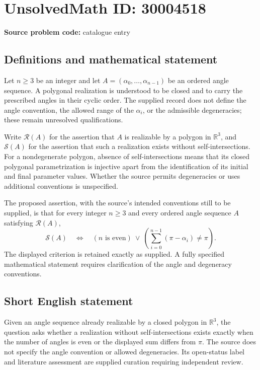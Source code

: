 \documentclass[11pt]{article}
\newcommand{\R}{\mathbb{R}}
\begin{document}
\section*{UnsolvedMath ID: 30004518}
\textbf{Source problem code:} catalogue entry
\subsection{Definitions and mathematical statement}
Let \(n\geq 3\) be an integer and let \(A=(\alpha_0,\ldots,\alpha_{n-1})\) be an ordered angle sequence. A polygonal realization is understood to be closed and to carry the prescribed angles in their cyclic order. The supplied record does not define the angle convention, the allowed range of the \(\alpha_i\), or the admissible degeneracies; these remain unresolved qualifications.

Write \(\mathcal R(A)\) for the assertion that \(A\) is realizable by a polygon in \(\R^3\), and \(\mathcal S(A)\) for the assertion that such a realization exists without self-intersections. For a nondegenerate polygon, absence of self-intersections means that its closed polygonal parametrization is injective apart from the identification of its initial and final parameter values. Whether the source permits degeneracies or uses additional conventions is unspecified.

The proposed assertion, with the source's intended conventions still to be supplied, is that for every integer \(n\geq 3\) and every ordered angle sequence \(A\) satisfying \(\mathcal R(A)\),
\[
\mathcal S(A)
\quad\Longleftrightarrow\quad
\left(n\text{ is even}\right)
\ \lor\ 
\left(\sum_{i=0}^{n-1}(\pi-\alpha_i)\neq\pi\right).
\]
The displayed criterion is retained exactly as supplied. A fully specified mathematical statement requires clarification of the angle and degeneracy conventions.
\subsection{Short English statement}
Given an angle sequence already realizable by a closed polygon in \(\R^3\), the question asks whether a realization without self-intersections exists exactly when the number of angles is even or the displayed sum differs from \(\pi\). The source does not specify the angle convention or allowed degeneracies. Its open-status label and literature assessment are supplied curation requiring independent review.
\end{document}
